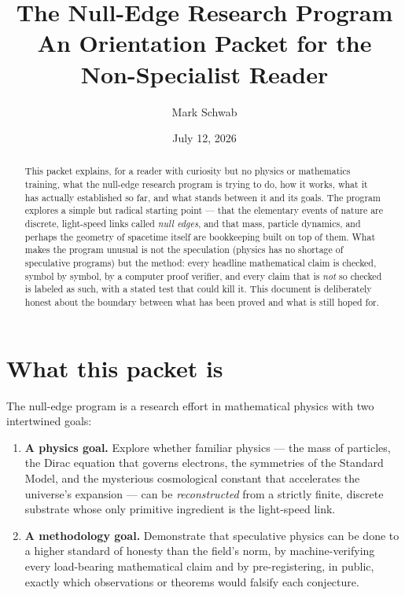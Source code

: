 \documentclass[11pt]{article}
\title{The Null-Edge Research Program\\
\large An Orientation Packet for the Non-Specialist Reader}
\author{Mark Schwab}
\date{July 12, 2026}
\begin{document}
\maketitle

\begin{abstract}
\noindent
This packet explains, for a reader with curiosity but no physics or
mathematics training, what the null-edge research program is trying to do,
how it works, what it has actually established so far, and what stands
between it and its goals.  The program explores a simple but radical
starting point --- that the elementary events of nature are discrete,
light-speed links called \emph{null edges}, and that mass, particle
dynamics, and perhaps the geometry of spacetime itself are bookkeeping
built on top of them.  What makes the program unusual is not the
speculation (physics has no shortage of speculative programs) but the
method: every headline mathematical claim is checked, symbol by symbol, by
a computer proof verifier, and every claim that is \emph{not} so checked
is labeled as such, with a stated test that could kill it.  This document
is deliberately honest about the boundary between what has been proved and
what is still hoped for.
\end{abstract}

\tableofcontents

\clearpage

\section{What this packet is}

The null-edge program is a research effort in mathematical physics with two
intertwined goals:

\begin{enumerate}
\item \textbf{A physics goal.}  Explore whether familiar physics --- the
  mass of particles, the Dirac equation that governs electrons, the
  symmetries of the Standard Model, and the mysterious cosmological
  constant that accelerates the universe's expansion --- can be
  \emph{reconstructed} from a strictly finite, discrete substrate whose
  only primitive ingredient is the light-speed link.
\item \textbf{A methodology goal.}  Demonstrate that speculative physics
  can be done to a higher standard of honesty than the field's norm, by
  machine-verifying every load-bearing mathematical claim and by
  pre-registering, in public, exactly which observations or theorems would
  falsify each conjecture.
\end{enumerate}
\end{document}
